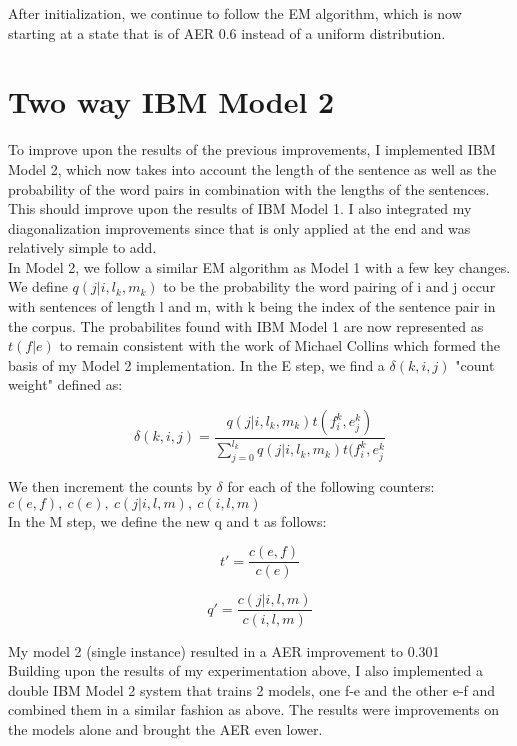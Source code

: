 \documentclass{article}
\begin{document}
After initialization, we continue to follow the EM algorithm, which is now starting at a state that is of AER 0.6 instead of a uniform distribution.

\section{Two way IBM Model 2}

To improve upon the results of the previous improvements, I implemented IBM Model 2, which now takes into account the length of the sentence as well as the probability of the word pairs in combination with the lengths of the sentences. This should improve upon the results of IBM Model 1. I also integrated my diagonalization improvements since that is only applied at the end and was relatively simple to add.\\

In Model 2, we follow a similar EM algorithm as Model 1 with a few key changes. We define $q(j|i,l_k,m_k)$ to be the probability the word pairing of i and j occur with sentences of length l and m, with k being the index of the sentence pair in the corpus. The probabilites found with IBM Model 1 are now represented as $t(f|e)$ to remain consistent with the work of Michael Collins which formed the basis of my Model 2 implementation. In the E step, we find a $\delta(k,i,j)$ "count weight" defined as:

\[
\delta(k,i,j) = \frac{q(j|i,l_k,m_k)t(f^k_i,e^k_j)}{\sum^{l_k}_{j=0}q(j|i,l_k,m_k)t(f^k_i,e^k_j}
\]

We then increment the counts by $\delta$ for each of the following counters:\\
$c(e,f), \ c(e),\ c(j|i,l,m),\ c(i,l,m)$\\

In the M step, we define the new q and t as follows:

\[
t' = \frac{c(e,f)}{c(e)}
\]

\[
q' = \frac{c(j|i,l,m)}{c(i,l,m)}
\]

My model 2 (single instance) resulted in a AER improvement to 0.301\\

Building upon the results of my experimentation above, I also implemented a double IBM Model 2 system that trains 2 models, one f-e and the other e-f and combined them in a similar fashion as above. The results were improvements on the models alone and brought the AER even lower.
\end{document}

